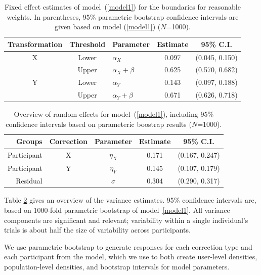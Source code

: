 \documentclass[11pt]{isuthesis}\usepackage[]{graphicx}\usepackage[]{color}
\begin{document}
\begin{table}[htbp]\centering
\begin{tabular}{cclcc}
  \hline
Transformation & Threshold &  \multicolumn{1}{c}{Parameter} & Estimate & 95\% C.I. \\ 
  \hline
X & Lower & $\alpha_X$ & 0.097 & (0.045, 0.150) \\ 
   & Upper& $\alpha_X + \beta$  & 0.625 & (0.570, 0.682) \\ 
  Y & Lower& $\alpha_Y$  & 0.143 & (0.097, 0.188) \\ 
   & Upper& $\alpha_Y + \beta$  & 0.671 & (0.626, 0.718) \\ 
   \hline
\end{tabular}
\caption[Sine Illusion Model: Fixed Effects]{Fixed effect estimates of model~(\ref{model1}) for the boundaries for reasonable weights. In parentheses,  95\% parametric bootstrap confidence intervals are given based on model (\ref{model1}) ($N$=1000).}\label{fixedeffectsresults}
\end{table}
\begin{table}[hbtp]\centering
\begin{tabular}{rcccc}
  \hline
Groups & Correction & Parameter & Estimate & 95\% C.I. \\ 
  \hline
  Participant & X &$\eta_X$  & 0.171 & (0.167, 0.247) \\ 
  Participant & Y &$\eta_Y$ &  0.145 & (0.107, 0.179) \\ 
  Residual &  &$\sigma$ &  0.304 & (0.290, 0.317) \\ 
   \hline
\end{tabular}
\caption[Sine Illusion Model: Random Effects]{Overview of random effects for model~(\ref{model1}), including 95\% confidence intervals based on parameteric boostrap results ($N$=1000).}\label{randomeffectsresults}
\end{table}

Table \ref{randomeffectsresults} gives an overview of the variance estimates. 95\% confidence intervals are, based on 1000-fold parametric bootstrap of model~\ref{model1}. All variance components are significant and relevant; variability within a single individual's trials is about half the size of variability across  participants. 

We use parametric bootstrap to generate responses for each correction type and each participant from the model, which we use to both  create user-level densities, population-level densities, and bootstrap intervals for model parameters. 
\end{document}
